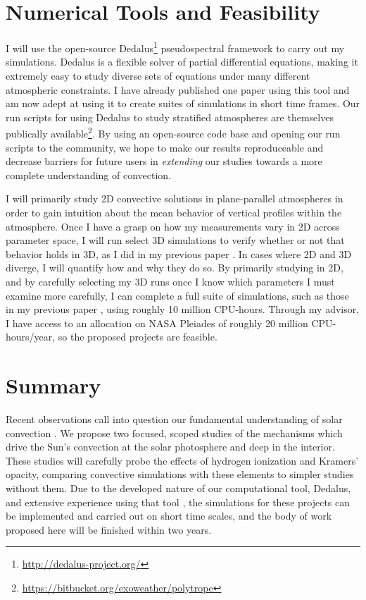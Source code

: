 \documentclass[aasms,12pt]{article}
\begin{document}
\vspace{-0.2cm}
\section{Numerical Tools and Feasibility}
\vspace{-0.2cm}
I will use the open-source Dedalus\footnote{\url{http://dedalus-project.org/}} pseudospectral framework 
\citep{burns&all2016} to carry out my simulations.  
Dedalus is a flexible solver of partial differential equations,
making it extremely easy to study diverse sets of equations under many different atmospheric
constraints.  I have already published one paper using this tool \citep{anders&brown2017}
and am now adept at using it to create suites of simulations
in short time frames. Our run scripts for using Dedalus to study stratified atmospheres
are themselves publically available\footnote{\url{https://bitbucket.org/exoweather/polytrope}}.
By using an open-source code base and opening our run scripts to the community, we hope to
make our results reproduceable and decrease barriers for future users in 
\emph{extending} our studies towards a more complete understanding of convection.


I will primarily study 2D convective solutions in plane-parallel atmospheres in order to gain
intuition about the mean behavior of vertical profiles within the atmosphere.  Once I have a grasp
on how my measurements vary in 2D across parameter space, I will run select 3D simulations to
verify whether or not that behavior holds in 3D, as I did in my previous paper \citep{anders&brown2017}.
In cases where 2D and 3D diverge, I will quantify how and why they do so.
By primarily studying in 2D, and by carefully
selecting my 3D runs once I know which parameters I must examine more carefully, I can complete
a full suite of simulations, such as those in my previous paper \citep{anders&brown2017}, using
roughly 10 million CPU-hours.  Through my advisor, I have access to an allocation on NASA Pleiades
of roughly 20 million CPU-hours/year, so the proposed projects are feasible.




\vspace{-0.2cm}
\section{Summary}
\vspace{-0.2cm}
Recent observations call into question our fundamental understanding of solar
convection \citep{hanasoge&all2012, greer&all2015, hathaway&all2015}.
We propose two focused, scoped studies of the mechanisms which drive the Sun's convection at
the solar photosphere and deep in the interior.
These studies will carefully probe the effects of hydrogen ionization and Kramers' opacity, comparing
convective simulations with these elements to simpler studies without them.
Due to the developed nature of
our computational tool, Dedalus, and extensive experience using that tool \citep{anders&brown2017},
the simulations for these projects can be implemented and
carried out on short time scales, and the body of work proposed here will be finished within
two years.


\newpage


\end{document}
